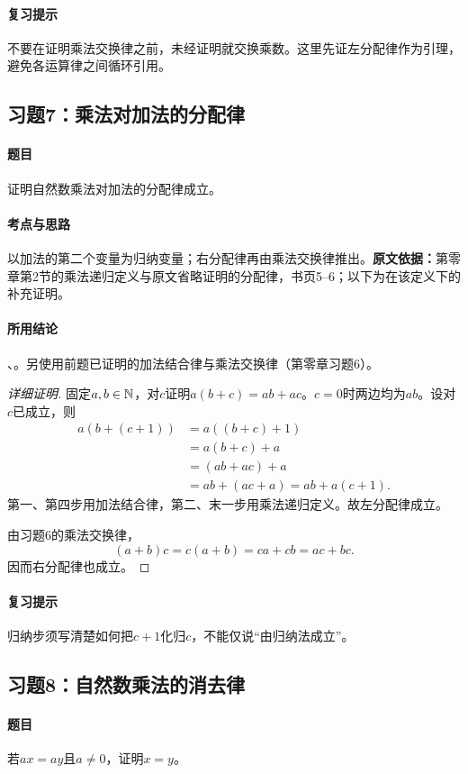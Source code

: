\paragraph{复习提示}不要在证明乘法交换律之前，未经证明就交换乘数。这里先证左分配律作为引理，避免各运算律之间循环引用。

\subsection{习题7：乘法对加法的分配律}\label{exercise:0:7}
\paragraph{题目}证明自然数乘法对加法的分配律成立。
\paragraph{考点与思路}以加法的第二个变量为归纳变量；右分配律再由乘法交换律推出。\textbf{原文依据：}第零章第2节的乘法递归定义与原文省略证明的分配律，书页5--6；以下为在该定义下的补充证明。
\paragraph{所用结论}、。另使用前题已证明的加法结合律与乘法交换律（第零章习题6）。
\begin{proof}[详细证明]
固定$a,b\in\mathbb N$，对$c$证明$a(b+c)=ab+ac$。$c=0$时两边均为$ab$。设对$c$已成立，则
\begin{align*}
a(b+(c+1))&=a((b+c)+1)\\
&=a(b+c)+a\\
&=(ab+ac)+a\\
&=ab+(ac+a)=ab+a(c+1).
\end{align*}
第一、第四步用加法结合律，第二、末一步用乘法递归定义。故左分配律成立。

由习题6的乘法交换律，
\[
(a+b)c=c(a+b)=ca+cb=ac+bc.
\]
因而右分配律也成立。
\end{proof}
\paragraph{复习提示}归纳步须写清楚如何把$c+1$化归$c$，不能仅说“由归纳法成立”。

\subsection{习题8：自然数乘法的消去律}\label{exercise:0:8}
\paragraph{题目}若$ax=ay$且$a\ne0$，证明$x=y$。
